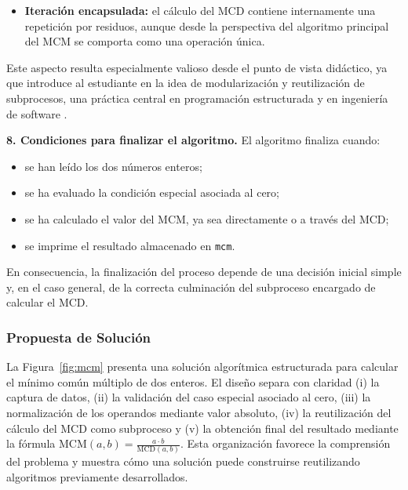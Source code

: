 \documentclass[12pt,twoside]{book}
\begin{document}
						\begin{itemize}
							\item \textbf{Iteración encapsulada:} el cálculo del MCD contiene internamente una repetición por residuos, aunque desde la perspectiva del algoritmo principal del MCM se comporta como una operación única.
						\end{itemize}
						
						\noindent
						Este aspecto resulta especialmente valioso desde el punto de vista didáctico, ya que introduce al estudiante en la idea de modularización y reutilización de subprocesos, una práctica central en programación estructurada y en ingeniería de software \cite{Sebesta2018Concepts,Farrell2018Programming}.
						
						\noindent
						\textbf{8. Condiciones para finalizar el algoritmo.}
						El algoritmo finaliza cuando:
						
						\begin{itemize}
							\item se han leído los dos números enteros;
							\item se ha evaluado la condición especial asociada al cero;
							\item se ha calculado el valor del MCM, ya sea directamente o a través del MCD;
							\item se imprime el resultado almacenado en \texttt{mcm}.
						\end{itemize}
						
						\noindent
						En consecuencia, la finalización del proceso depende de una decisión inicial simple y, en el caso general, de la correcta culminación del subproceso encargado de calcular el MCD.
						
					\subsubsection{Propuesta de Solución}
						\noindent
						La Figura~\ref{fig:mcm} presenta una solución algorítmica estructurada para calcular el mínimo común múltiplo de dos enteros. El diseño separa con claridad (i) la captura de datos, (ii) la validación del caso especial asociado al cero, (iii) la normalización de los operandos mediante valor absoluto, (iv) la reutilización del cálculo del MCD como subproceso y (v) la obtención final del resultado mediante la fórmula \(\text{MCM}(a,b)=\frac{a\cdot b}{\text{MCD}(a,b)}\). Esta organización favorece la comprensión del problema y muestra cómo una solución puede construirse reutilizando algoritmos previamente desarrollados.
						
\end{document}

